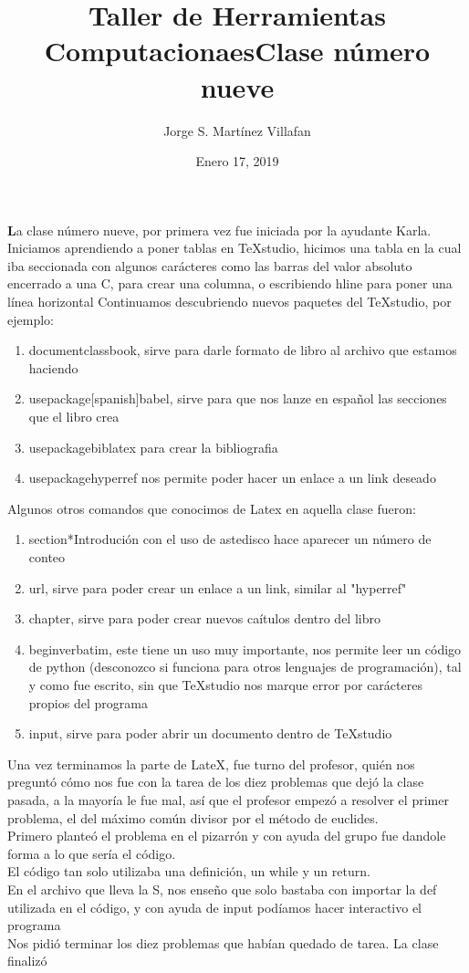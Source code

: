 \documentclass[letterpaper, 12pt, oneside]{article}%
\title{\Huge Taller de Herramientas Computacionaes}
\author{Jorge S. Martínez Villafan}
\date{Enero 17, 2019}
\begin{document}
\maketitle
\newpage
\title{Clase número nueve}

\textbf La clase número nueve, por primera vez fue iniciada por la ayudante Karla. Iniciamos aprendiendo a poner tablas en TeXstudio, hicimos una tabla en la cual iba seccionada con algunos carácteres como las barras del valor absoluto encerrado a una C, para crear una columna, o escribiendo hline para poner una línea horizontal
Continuamos descubriendo nuevos paquetes del TeXstudio, por ejemplo:
\begin{enumerate}
\item documentclass{book}, sirve para darle formato de libro al archivo que estamos haciendo
\item usepackage[spanish]{babel}, sirve para que nos lanze en español las secciones que el libro crea
\item usepackage{biblatex} para crear la bibliografia
\item usepackage{hyperref} nos permite poder hacer un enlace a un link deseado
\end{enumerate}
Algunos otros comandos que conocimos de Latex en aquella clase fueron: 
\begin{enumerate}
	\item section*{Introdución} con el uso de astedisco hace aparecer un número de conteo
	\item url, sirve para poder crear un enlace a un link, similar al "hyperref"
	\item chapter, sirve para poder crear nuevos caítulos dentro del libro
	\item begin{verbatim}, este tiene un uso muy importante, nos permite leer un código de python (desconozco si funciona para otros lenguajes de programación), tal y como fue escrito, sin que TeXstudio nos marque error por carácteres propios del programa
	\item input, sirve para poder abrir un documento dentro de TeXstudio
\end{enumerate}
Una vez terminamos la parte de LateX, fue turno del profesor, quién nos preguntó cómo nos fue con la tarea de los diez problemas que dejó la clase pasada, a la mayoría le fue mal, así que el profesor empezó a resolver el primer problema, el del máximo común divisor por el método de euclides.\\
Primero planteó el problema en el pizarrón y con ayuda del grupo fue dandole forma a lo que sería el código. \\
El código tan solo utilizaba una definición, un while y un return.\\
En el archivo que lleva la S, nos enseño que solo bastaba con importar la def utilizada en el código, y con ayuda de input podíamos hacer interactivo el programa\\

Nos pidió terminar los diez problemas que habían quedado de tarea.
La clase finalizó
\end{document}
